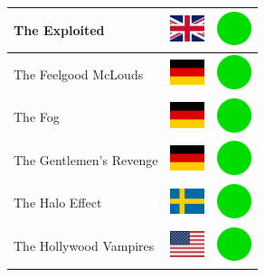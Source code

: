 \documentclass[12pt, a4paper, twoside]{report}
\begin{document}
\begin{center}
\begin{longtable}{|p{5cm}|p{2cm}|p{2cm}|}
 The Exploited                                              & \includegraphics[width=1cm]{../4x3/gb} &   \includegraphics[width=1cm]{../likes/y} \\ \hline
 The Feelgood McLouds                                       & \includegraphics[width=1cm]{../4x3/de} &   \includegraphics[width=1cm]{../likes/y} \\ \hline
 The Fog                                                    & \includegraphics[width=1cm]{../4x3/de} &   \includegraphics[width=1cm]{../likes/y} \\ \hline
 The Gentlemen's Revenge                                    & \includegraphics[width=1cm]{../4x3/de} &   \includegraphics[width=1cm]{../likes/y} \\ \hline
 The Halo Effect                                            & \includegraphics[width=1cm]{../4x3/se} &   \includegraphics[width=1cm]{../likes/y} \\ \hline
 The Hollywood Vampires                                     & \includegraphics[width=1cm]{../4x3/us} &   \includegraphics[width=1cm]{../likes/y} \\ \hline

\end{longtable}
\end{center}
\end{document}
